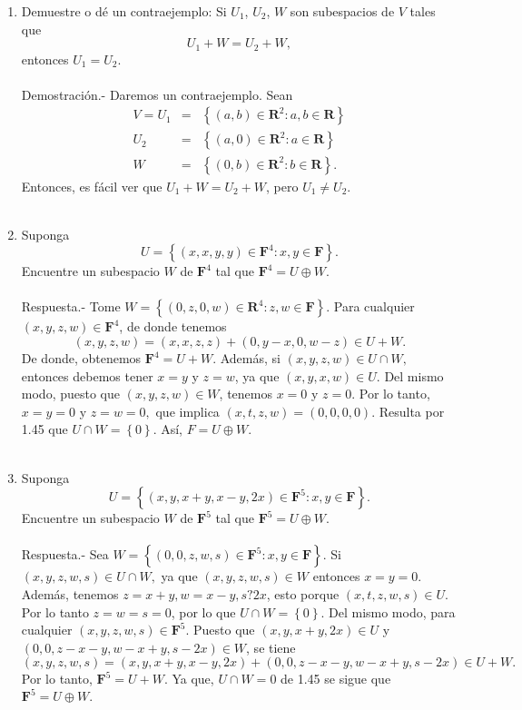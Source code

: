 \begin{enumerate}[\bfseries 1.]
    \item Demuestre o dé un contraejemplo: Si $U_1$, $U_2$, $W$ son subespacios de $V$ tales que 
    $$U_1+W=U_2+W,$$
    entonces $U_1=U_2$.\\\\
    Demostración.-\; Daremos un contraejemplo. Sean 
    $$\begin{array}{rcl}
	V=U_1&=&\left\{(a,b)\in \textbf{R}^2:a,b\in \textbf{R}\right\}\\
	U_2&=&\left\{(a,0)\in \textbf{R}^2:a\in \textbf{R}\right\}\\
	W&=&\left\{(0,b)\in \textbf{R}^2:b\in \textbf{R}\right\}. 
    \end{array}$$
	Entonces, es fácil ver que $U_1+W=U_2+W$, pero $U_1\neq U_2$.\\\\

    \item Suponga
    $$U=\left\{(x,x,y,y)\in \textbf{F}^4:x,y\in \textbf{F}\right\}.$$
    Encuentre un subespacio $W$ de $\textbf{F}^4$ tal que $\textbf{F}^4=U \oplus W.$\\\\
	Respuesta.-\; Tome $W=\left\{(0,z,0,w)\in \textbf{R}^4:z,w\in \textbf{F}\right\}$. Para cualquier $(x,y,z,w)\in\textbf{F}^4$, de donde tenemos
	$$(x,y,z,w)=(x,x,z,z)+(0,y-x,0,w-z)\in U+W.$$
	De donde, obtenemos $\textbf{F}^4=U+W$. Además, si $(x,y,z,w)\in U\cap W,$ entonces debemos tener $x=y$ y $z=w$, ya que $(x,y,x,w)\in U.$ Del mismo modo, puesto que $(x,y,z,w)\in W$, tenemos $x=0$ y $z=0$. Por lo tanto, $x=y=0$ y $z=w=0,$ que implica $(x,t,z,w)=(0,0,0,0)$. Resulta por 1.45 que $U\cap W = \left\{0\right\}$. Así, $F=U\oplus W$.\\\\

    \item Suponga
    $$U=\left\{(x,y,x+y,x-y,2x)\in \textbf{F}^5: x,y\in \textbf{F}\right\}.$$
    Encuentre un subespacio $W$ de $\textbf{F}^5$ tal que $\textbf{F}^5=U\oplus W.$\\\\
    Respuesta.-\; Sea $W=\left\{(0,0,z,w,s)\in \textbf{F}^5: x,y\in \textbf{F}\right\}$. Si $(x,y,z,w,s)\in U\cap W,$ ya que $(x,y,z,w,s)\in W$ entonces $x=y=0$. Además, tenemos $z=x+y,w=x-y,s?2x$, esto porque $(x,t,z,w,s)\in U$. Por lo tanto $z=w=s=0$, por lo que $U\cap W=\left\{0\right\}.$ Del mismo modo, para cualquier $(x,y,z,w,s)\in \textbf{F}^5$. Puesto que $(x,y,x+y,2x)\in U$ y $(0,0,z-x-y,w-x+y,s-2x)\in W$, se tiene
    $$(x,y,z,w,s)=(x,y,x+y,x-y,2x)+(0,0,z-x-y,w-x+y,s-2x)\in U+W.$$
    Por lo tanto, $\textbf{F}^5=U+W$. Ya que, $U\cap W = 0$ de 1.45 se sigue que $\textbf{F}^5=U\oplus W.$\\\\


\end{enumerate}
